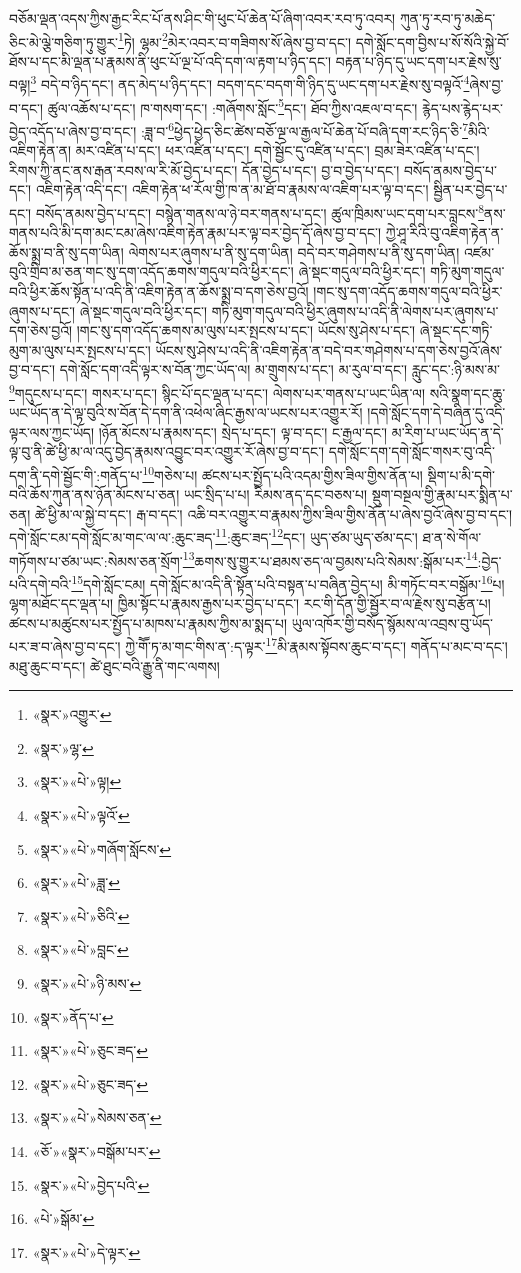 བཅོམ་ལྡན་འདས་ཀྱིས་རྒྱང་རིང་པོ་ནས་ཤིང་གི་ཕུང་པོ་ཆེན་པོ་ཞིག་འབར་རབ་ཏུ་འབར། ཀུན་ཏུ་རབ་ཏུ་མཆེད་ཅིང་མེ་ལྕེ་གཅིག་ཏུ་གྱུར་\footnote{«སྣར་»འགྱུར་}ཏེ། ལྷམ་\footnote{«སྣར་»ལྷ་}མེར་འབར་བ་གཟིགས་སོ་ཞེས་བྱ་བ་དང་། དགེ་སློང་དག་བྱིས་པ་སོ་སོའི་སྐྱེ་བོ་ཐོས་པ་དང་མི་ལྡན་པ་རྣམས་ནི་ཕུང་པོ་ལྔ་པོ་འདི་དག་ལ་རྟག་པ་ཉིད་དང་། བརྟན་པ་ཉིད་དུ་ཡང་དག་པར་རྗེས་སུ་བལྟ།\footnote{«སྣར་»«པེ་»ལྟ།} བདེ་བ་ཉིད་དང་། ནད་མེད་པ་ཉིད་དང་། བདག་དང་བདག་གི་ཉིད་དུ་ཡང་དག་པར་རྗེས་སུ་བལྟའོ་\footnote{«སྣར་»«པེ་»ལྟའོ་}ཞེས་བྱ་བ་དང་། ཚུལ་འཆོས་པ་དང་། ཁ་གསག་དང་། :གཞོགས་སློང་\footnote{«སྣར་»«པེ་»གཞོག་སློངས་}དང་། ཐོབ་ཀྱིས་འཇལ་བ་དང་། རྙེད་པས་རྙེད་པར་བྱེད་འདོད་པ་ཞེས་བྱ་བ་དང་། :ཟླ་བ་\footnote{«སྣར་»«པེ་»ཟླ་}ཕྱེད་ཕྱེད་ཅིང་ཚེས་བཅོ་ལྔ་ལ་རྒྱལ་པོ་ཆེན་པོ་བཞི་དག་རང་ཉིད་ཅི་\footnote{«སྣར་»«པེ་»ཅིའི་}མིའི་འཇིག་རྟེན་ན། མར་འཛིན་པ་དང་། ཕར་འཛིན་པ་དང་། དགེ་སྦྱོང་དུ་འཛིན་པ་དང་། བྲམ་ཟེར་འཛིན་པ་དང་། རིགས་ཀྱི་ནང་ནས་རྒན་རབས་ལ་རི་མོ་བྱེད་པ་དང་། དོན་བྱེད་པ་དང་། བྱ་བ་བྱེད་པ་དང་། བསོད་ནམས་བྱེད་པ་དང་། འཇིག་རྟེན་འདི་དང་། འཇིག་རྟེན་ཕ་རོལ་གྱི་ཁ་ན་མ་ཐོ་བ་རྣམས་ལ་འཇིག་པར་ལྟ་བ་དང་། སྦྱིན་པར་བྱེད་པ་དང་། བསོད་ནམས་བྱེད་པ་དང་། བསྙེན་གནས་ལ་ཉེ་བར་གནས་པ་དང་། ཚུལ་ཁྲིམས་ཡང་དག་པར་བླངས་\footnote{«སྣར་»«པེ་»བླང་}ནས་གནས་པའི་མི་དག་མང་ངམ་ཞེས་འཇིག་རྟེན་རྣམ་པར་ལྟ་བར་བྱེད་དོ་ཞེས་བྱ་བ་དང་། ཀྱེ་ཤཱ་རིའི་བུ་འཇིག་རྟེན་ན་ཆོས་སྨྲ་བ་ནི་སུ་དག་ཡིན། ལེགས་པར་ཞུགས་པ་ནི་སུ་དག་ཡིན། བདེ་བར་གཤེགས་པ་ནི་སུ་དག་ཡིན། འཛམ་བུའི་གྲིབ་མ་ཅན་གང་སུ་དག་འདོད་ཆགས་གདུལ་བའི་ཕྱིར་དང་། ཞེ་སྡང་གདུལ་བའི་ཕྱིར་དང་། གཏི་མུག་གདུལ་བའི་ཕྱིར་ཆོས་སྟོན་པ་འདི་ནི་འཇིག་རྟེན་ན་ཆོས་སྨྲ་བ་དག་ཅེས་བྱའོ། །གང་སུ་དག་འདོད་ཆགས་གདུལ་བའི་ཕྱིར་ཞུགས་པ་དང་། ཞེ་སྡང་གདུལ་བའི་ཕྱིར་དང་། གཏི་མུག་གདུལ་བའི་ཕྱིར་ཞུགས་པ་འདི་ནི་ལེགས་པར་ཞུགས་པ་དག་ཅེས་བྱའོ། །གང་སུ་དག་འདོད་ཆགས་མ་ལུས་པར་སྤངས་པ་དང་། ཡོངས་སུ་ཤེས་པ་དང་། ཞེ་སྡང་དང་གཏི་མུག་མ་ལུས་པར་སྤངས་པ་དང་། ཡོངས་སུ་ཤེས་པ་འདི་ནི་འཇིག་རྟེན་ན་བདེ་བར་གཤེགས་པ་དག་ཅེས་བྱའོ་ཞེས་བྱ་བ་དང་། དགེ་སློང་དག་འདི་ལྟར་ས་བོན་ཀྱང་ཡོད་ལ། མ་གྲུགས་པ་དང་། མ་རུལ་བ་དང་། རླུང་དང་:ཉི་མས་མ་\footnote{«སྣར་»«པེ་»ཉི་མས་}གདུངས་པ་དང་། གསར་པ་དང་། སྙིང་པོ་དང་ལྡན་པ་དང་། ལེགས་པར་གནས་པ་ཡང་ཡིན་ལ། སའི་སྣག་དང་ཆུ་ཡང་ཡོད་ན་དེ་ལྟ་བུའི་ས་བོན་དེ་དག་ནི་འཕེལ་ཞིང་རྒྱས་ལ་ཡངས་པར་འགྱུར་རོ། །དགེ་སློང་དག་དེ་བཞིན་དུ་འདི་ལྟར་ལས་ཀྱང་ཡོད། །ཉོན་མོངས་པ་རྣམས་དང་། སྲེད་པ་དང་། ལྟ་བ་དང་། ང་རྒྱལ་དང་། མ་རིག་པ་ཡང་ཡོད་ན་དེ་ལྟ་བུ་ནི་ཚེ་ཕྱི་མ་ལ་འདུ་བྱེད་རྣམས་འབྱུང་བར་འགྱུར་རོ་ཞེས་བྱ་བ་དང་། དགེ་སློང་དག་དགེ་སློང་གསར་བུ་འདི་དག་ནི་དགེ་སྦྱོང་གི་:གནོད་པ་\footnote{«སྣར་»ནོད་པ་}གཅེས་པ། ཚངས་པར་སྤྱོད་པའི་འདམ་གྱིས་ཟིལ་གྱིས་ནོན་པ། སྡིག་པ་མི་དགེ་བའི་ཆོས་ཀུན་ནས་ཉོན་མོངས་པ་ཅན། ཡང་སྲིད་པ་པ། རིམས་ནད་དང་བཅས་པ། སྡུག་བསྔལ་གྱི་རྣམ་པར་སྨིན་པ་ཅན། ཚེ་ཕྱི་མ་ལ་སྐྱེ་བ་དང་། རྒ་བ་དང་། འཆི་བར་འགྱུར་བ་རྣམས་ཀྱིས་ཟིལ་གྱིས་ནོན་པ་ཞེས་བྱའོ་ཞེས་བྱ་བ་དང་། དགེ་སློང་ངམ་དགེ་སློང་མ་གང་ལ་ལ་:ཆུང་ཟད་\footnote{«སྣར་»«པེ་»ཅུང་ཟད་}:ཆུང་ཟད་\footnote{«སྣར་»«པེ་»ཅུང་ཟད་}དང་། ཡུད་ཙམ་ཡུད་ཙམ་དང་། ཐ་ན་སེ་གོལ་གཏོགས་པ་ཙམ་ཡང་:སེམས་ཅན་སྲོག་\footnote{«སྣར་»«པེ་»སེམས་ཅན་}ཆགས་སུ་གྱུར་པ་ཐམས་ཅད་ལ་བྱམས་པའི་སེམས་:སྒོམ་པར་\footnote{«ཅོ་»«སྣར་»བསྒོམ་པར་}:བྱེད་པའི་དགེ་བའི་\footnote{«སྣར་»«པེ་»བྱེད་པའི་}དགེ་སློང་ངམ། དགེ་སློང་མ་འདི་ནི་སྟོན་པའི་བསྟན་པ་བཞིན་བྱེད་པ། མི་གཏོང་བར་བསྒོམ་\footnote{«པེ་»སྒོམ་}པ། ལྷག་མཐོང་དང་ལྡན་པ། ཁྱིམ་སྟོང་པ་རྣམས་རྒྱས་པར་བྱེད་པ་དང་། རང་གི་དོན་གྱི་སྦྱོར་བ་ལ་རྗེས་སུ་བརྩོན་པ། ཚངས་པ་མཚུངས་པར་སྤྱོད་པ་མཁས་པ་རྣམས་ཀྱིས་མ་སྨད་པ། ཡུལ་འཁོར་གྱི་བསོད་སྙོམས་ལ་འབྲས་བུ་ཡོད་པར་ཟ་བ་ཞེས་བྱ་བ་དང་། ཀྱེ་གཽ་ཏ་མ་གང་གིས་ན་:ད་ལྟར་\footnote{«སྣར་»«པེ་»དེ་ལྟར་}མི་རྣམས་སྟོབས་ཆུང་བ་དང་། གནོད་པ་མང་བ་དང་། མཐུ་ཆུང་བ་དང་། ཚེ་ཐུང་བའི་རྒྱུ་ནི་གང་ལགས། 
